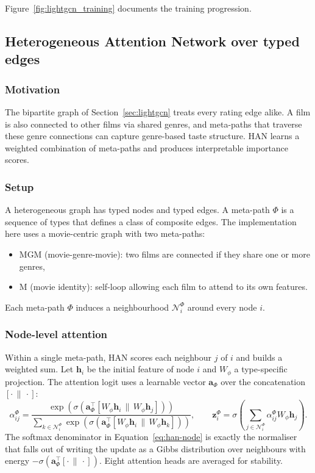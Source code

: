 \documentclass{article}
\begin{document}
Figure~\ref{fig:lightgcn_training} documents the training progression.

\subsection{Heterogeneous Attention Network over typed edges}
\label{sec:han}

\subsubsection*{Motivation}

The bipartite graph of Section~\ref{sec:lightgcn} treats every rating edge alike. A film is also connected to other films via shared genres, and meta-paths that traverse these genre connections can capture genre-based taste structure. HAN learns a weighted combination of meta-paths and produces interpretable importance scores.

\subsubsection*{Setup}

A heterogeneous graph has typed nodes and typed edges. A meta-path $\Phi$ is a sequence of types that defines a class of composite edges. The implementation here uses a movie-centric graph with two meta-paths:
\begin{itemize}
    \item MGM (movie-genre-movie): two films are connected if they share one or more genres,
    \item M (movie identity): self-loop allowing each film to attend to its own features.
\end{itemize}
Each meta-path $\Phi$ induces a neighbourhood $\mathcal{N}^\Phi_i$ around every node $i$.

\subsubsection*{Node-level attention}

Within a single meta-path, HAN scores each neighbour $j$ of $i$ and builds a weighted sum. Let $\mathbf{h}_i$ be the initial feature of node $i$ and $W_\phi$ a type-specific projection. The attention logit uses a learnable vector $\mathbf{a}_\Phi$ over the concatenation $[\cdot \,\|\, \cdot]$:
\begin{equation}
\alpha^\Phi_{ij} = \frac{\exp(\sigma(\mathbf{a}_\Phi^\top [W_\phi \mathbf{h}_i \,\|\, W_\phi \mathbf{h}_j]))}{\sum_{k \in \mathcal{N}^\Phi_i} \exp(\sigma(\mathbf{a}_\Phi^\top [W_\phi \mathbf{h}_i \,\|\, W_\phi \mathbf{h}_k]))}, \qquad \mathbf{z}^\Phi_i = \sigma\!\left(\sum_{j \in \mathcal{N}^\Phi_i} \alpha^\Phi_{ij} W_\phi \mathbf{h}_j\right).
\label{eq:han-node}
\end{equation}
The softmax denominator in Equation~\ref{eq:han-node} is exactly the normaliser that falls out of writing the update as a Gibbs distribution over neighbours with energy $-\sigma(\mathbf{a}_\Phi^\top [\cdot \,\|\, \cdot])$. Eight attention heads are averaged for stability.
\end{document}
